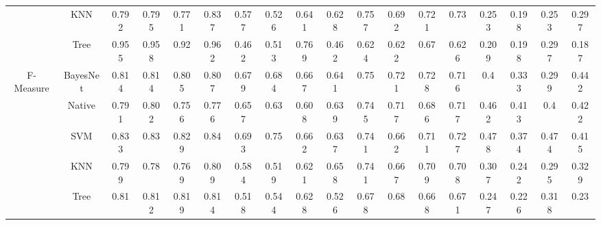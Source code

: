 {\begin{table*}[htbp]
\begin{tabular}{cccccccccccccccccc}
&KNN&	0.792	&0.795	&0.771	&0.837		&0.577	&0.526	&0.641	&0.628		&0.757	&0.692	&0.721	&0.73	&	0.253	&0.198	&0.253	&0.297\\
&Tree&	0.955	&0.958	&0.92&	0.962		&0.462	&0.513	&0.769&	0.462&		0.624&	0.622&	0.67&	0.626&		0.209&	0.198&	0.297&	0.187\\
\hline
\multirow{5}{*}{F-Measure}
&BayesNet&0.814&	0.814	&0.805&	0.807	&	0.679&	0.684	&0.667	&0.641	&	0.75	&0.721&	0.728	&0.716	&	0.4	&0.333&	0.299	&0.442\\
&Native&0.791&	0.802&	0.756&	0.776		&0.657	&0.63&	0.608	&0.639	&	0.745	&0.717	&0.686	&0.717	&	0.462&	0.413	&0.4	&0.422\\
&SVM&	0.833	&0.83&	0.829&	0.84&		0.693&	0.75&	0.662&	0.637&		0.741&	0.662&	0.711&	0.727&		0.478&	0.374&	0.474	&0.415\\
&KNN&	0.799	&0.78	&0.769&	0.809&		0.584	&0.519	&0.621	&0.658	&	0.741	&0.667	&0.709	&0.708	&	0.307	&0.242	&0.295	&0.329\\
&Tree&	0.81	&0.812	&0.819&	0.814&		0.518&	0.544&	0.628&	0.526&		0.678&	0.68&	0.668	&0.671&		0.247&	0.226&	0.318&	0.23\\
\bottomrule[1.5pt]
\end{tabular}
\end{table*}

}

